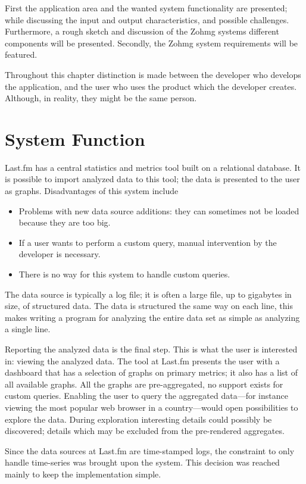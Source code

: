 First the application area and the wanted system functionality are presented;
while discussing the input and output characteristics, and possible challenges.
Furthermore, a rough sketch and discussion of the Zohmg systems different
components will be presented. Secondly, the Zohmg system requirements will be
featured.

Throughout this chapter distinction is made between the developer who develops
the application, and the user who uses the product which the developer
creates. Although, in reality, they might be the same person.


\section{System Function}

Last.fm has a central statistics and metrics tool built on a relational
database. It is possible to import analyzed data to this tool; the data is
presented to the user as graphs. Disadvantages of this system include
\begin{itemize}
\item Problems with new data source additions: they can sometimes not be loaded
because they are too big.
\item If a user wants to perform a custom query, manual intervention by the
developer is necessary.
\item There is no way for this system to handle custom queries.
\end{itemize}

The data source is typically a log file; it is often a large file, up to
gigabytes in size, of structured data. The data is structured the same way on
each line, this makes writing a program for analyzing the entire data set as
simple as analyzing a single line.

Reporting the analyzed data is the final step. This is what the user is
interested in: viewing the analyzed data. The tool at Last.fm presents the user
with a dashboard that has a selection of graphs on primary metrics; it also has
a list of all available graphs. All the graphs are pre-aggregated, no support
exists for custom queries. Enabling the user to query the aggregated data---for
instance viewing the most popular web browser in a country---would open
possibilities to explore the data. During exploration interesting details could
possibly be discovered; details which may be excluded from the pre-rendered
aggregates.

Since the data sources at Last.fm are time-stamped logs, the constraint to only
handle time-series was brought upon the system. This decision was reached
mainly to keep the implementation simple.


